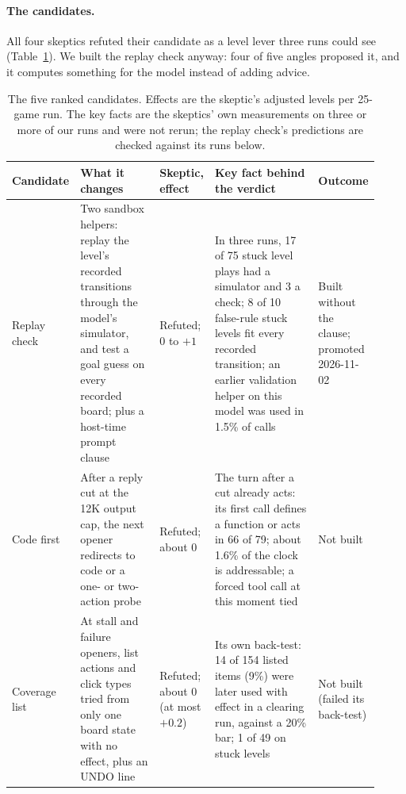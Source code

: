 \paragraph{The candidates.}
All four skeptics refuted their candidate as a level lever three runs could see (Table~\ref{tab:researchcand}). We built the replay check anyway: four of five angles proposed it, and it computes something for the model instead of adding advice. %

\begin{table}[!htb]
\caption{The five ranked candidates. Effects are the skeptic's adjusted levels per 25-game run. The key facts are the skeptics' own measurements on three or more of our runs and were not rerun; the replay check's predictions are checked against its runs below.}\label{tab:researchcand} %
\centering\footnotesize
\setlength{\tabcolsep}{3pt}
\begin{tabular}{@{}>{\raggedright\arraybackslash}p{0.11\linewidth}>{\raggedright\arraybackslash}p{0.24\linewidth}>{\raggedright\arraybackslash}p{0.13\linewidth}>{\raggedright\arraybackslash}p{0.33\linewidth}>{\raggedright\arraybackslash}p{0.11\linewidth}@{}}
\toprule
Candidate & What it changes & Skeptic, effect & Key fact behind the verdict & Outcome \\
\midrule
Replay check & Two sandbox helpers: replay the level's recorded transitions through the model's simulator, and test a goal guess on every recorded board; plus a host-time prompt clause & Refuted; 0 to $+1$ & In three runs, 17 of 75 stuck level plays had a simulator and 3 a check; 8 of 10 false-rule stuck levels fit every recorded transition; an earlier validation helper on this model was used in 1.5\% of calls & Built without the clause; promoted 2026-11-02 \\
Code first & After a reply cut at the 12K output cap, the next opener redirects to code or a one- or two-action probe & Refuted; about 0 & The turn after a cut already acts: its first call defines a function or acts in 66 of 79; about 1.6\% of the clock is addressable; a forced tool call at this moment tied & Not built \\
Coverage list & At stall and failure openers, list actions and click types tried from only one board state with no effect, plus an UNDO line & Refuted; about 0 (at most $+0.2$) & Its own back-test: 14 of 154 listed items (9\%) were later used with effect in a clearing run, against a 20\% bar; 1 of 49 on stuck levels & Not built (failed its back-test) \\

\end{tabular}
\end{table}
